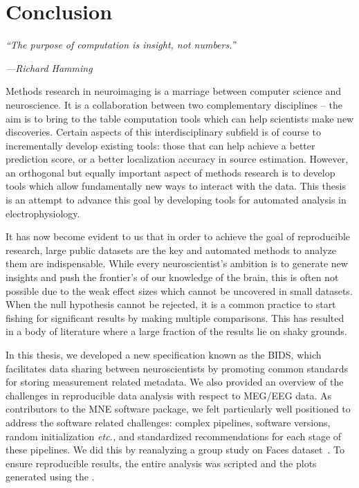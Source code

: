 \chapter{Conclusion}
\label{chapter:conclusion}

\epigraph{\small\itshape ``The purpose of computation is insight, not  numbers.''}{\small\textit{---Richard Hamming}}

Methods research in neuroimaging is a marriage between computer science and neuroscience. It is a collaboration between two complementary disciplines -- the aim is to bring to the table computation tools which can help scientists make new discoveries. Certain aspects of this interdisciplinary subfield is of course to incrementally develop existing tools: those that can help achieve a better prediction score, or a better localization accuracy in source estimation. However, an orthogonal but equally important aspect of methods research is to develop tools which allow fundamentally new ways to interact with the data. This thesis is an attempt to advance this goal by developing tools for automated analysis in electrophysiology.

It has now become evident to us that in order to achieve the goal of reproducible research, large public datasets are the key and automated methods to analyze them are indispensable. While every neuroscientist's ambition is to generate new insights and push the frontier's of our knowledge of the brain, this is often not possible due to the weak effect sizes which cannot be uncovered in small datasets. When the null hypothesis cannot be rejected, it is a common practice to start fishing for significant results by making multiple comparisons. This has resulted in a body of literature where a large fraction of the results lie on shaky grounds. 

In this thesis, we developed a new specification known as the \ac{BIDS}, which facilitates data sharing between neuroscientists by promoting common standards for storing measurement related metadata. We also provided an overview of the challenges in reproducible data analysis with respect to \ac{MEG}/\ac{EEG} data. As contributors to the MNE software package, we felt particularly well positioned to address  the software related challenges: complex pipelines, software versions, random initialization \emph{etc.,} and standardized recommendations for each stage of these pipelines. We did this by reanalyzing a group study on Faces dataset~\citep{wakeman2015multi}. To ensure reproducible results, the entire analysis was scripted and the plots generated using the .

